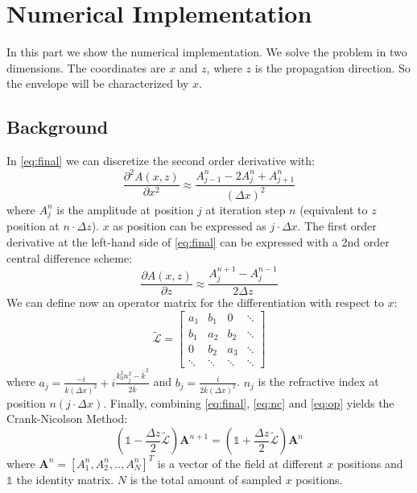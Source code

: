 \documentclass[a4paper,12pt]{scrartcl}
\begin{document}
 \section{Numerical Implementation}

    In this part we show the numerical implementation. We solve the problem in two dimensions. 
    The coordinates are $x$ and $z$, where $z$ is the propagation direction. So the envelope will be characterized by $x$.
    
    \subsection{Background}

          In \autoref{eq:final} we can discretize the second order derivative with:
        \begin{equation}
            \frac{\partial^2 A(x,z)}{\partial x^2} \approx \frac{A_{j-1}^n - 2 A_j^n + A_{j+1}^n}{(\Delta x) ^2}
            \label{eq:nc}
        \end{equation}
        where $A_j^n$ is the amplitude at position $j$ at iteration step $n$ (equivalent to $z$ position at $n \cdot \Delta z$). $x$ as position can be expressed
        as $j \cdot \Delta x$.
        The first order derivative at the left-hand side of \autoref{eq:final} can be expressed with a 2nd order central difference scheme:
        \begin{equation}
             \frac{\partial A(x,z)}{\partial z} \approx \frac{A_j^{n+1} - A_j^{n-1}}{2\Delta z}
        \end{equation}
        We can define now an operator matrix for the differentiation with respect to $x$:
        \begin{equation}
            \tilde{ \mathcal{L}} = 
             \begin{bmatrix}
            a_1 & b_1  &  0 &  \ddots   \\ 
             b_1 & a_2 & b_2  & \ddots      \\
             0 & b_2  & a_3 & \ddots   \\
             \ddots & \ddots & \ddots & \ddots         
            \end{bmatrix} 
            \label{eq:op}
        \end{equation}
        where $a_j = \frac{-i}{\bar k (\Delta x)^2} + i \frac{k_0^2 n_j^2 -\bar k^2}{2 \bar k}$
        and $b_j = \frac{i}{2 \bar k (\Delta x)^2}$. $n_j$ is the refractive index at position $n(j \cdot \Delta x)$.
        Finally, combining  \autoref{eq:final}, \autoref{eq:nc} and \autoref{eq:op} yields the Crank-Nicolson Method:
        \begin{equation}
            \left(\mathbb{1} - \frac{\Delta z}{2} \tilde{ \mathcal{L}}\right) \mathbf{A}^{n+1} = 
            \left(\mathbb{1} + \frac{\Delta z}{2} \tilde{ \mathcal{L}}\right) \mathbf{A}^{n}
            \label{eq:numeq}
        \end{equation}
        where $\mathbf A^n = [A_1^n , A_2^n, .., A_N^n]^T$ is a vector of the field at different $x$ positions and $\mathbb 1$ the identity matrix. $N$ is the total amount of sampled $x$ positions.
\end{document}
